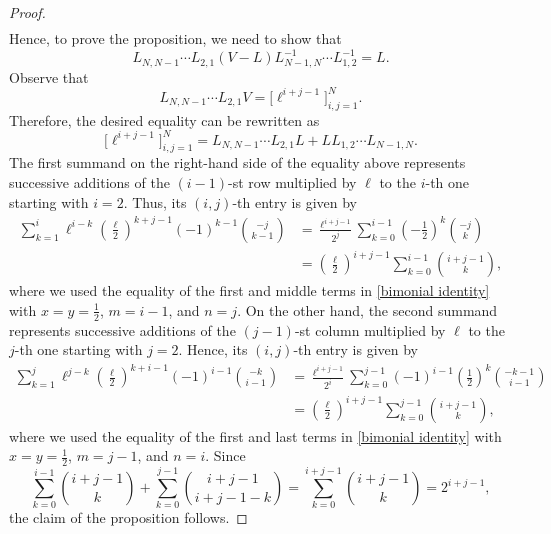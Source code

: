 \documentclass[10pt,a4paper]{amsart}
\begin{document}
\begin{proof}
\begin{multline*}
\end{multline*}
Hence, to prove the proposition, we need to show that
\[
L_{N,N-1}\cdots L_{2,1} (V-L) L_{N-1,N}^{-1} \cdots L_{1,2}^{-1} = L.
\]
Observe that
\[
L_{N,N-1}\cdots L_{2,1} V  = \big[\ell^{i+j-1}\big]_{i,j=1}^N.
\]
Therefore, the desired equality can be rewritten as
\[
\big[\ell^{i+j-1}\big]_{i,j=1}^N = L_{N,N-1}\cdots L_{2,1} L + L L_{1,2}\cdots L_{N-1,N}.
\]
The first summand on the right-hand side of the equality above represents successive additions of the \( (i-1) \)-st row multiplied by \( \ell \) to the \( i\)-th one starting with \( i=2 \). Thus, its \( (i,j) \)-th entry is given by
\begin{align*}
    \sum_{k=1}^i \ell^{i-k}\left(\frac\ell2\right)^{k+j-1}(-1)^{k-1}\binom{-j}{k-1} & = \frac{\ell^{i+j-1}}{2^j} \sum_{k=0}^{i-1} \left(-\frac12 \right)^k \binom{-j}{k} \\
    & = \left(\frac\ell2\right)^{i+j-1}\sum_{k=0}^{i-1} \binom{i+j-1}{k},
\end{align*}
where we used the equality of the first and middle terms in \eqref{bimonial identity} with \( x=y=\tfrac12\), \( m=i-1 \), and \( n=j \). On the other hand, the second summand represents successive additions of the \( (j-1) \)-st column multiplied by \( \ell \) to the \( j\)-th one starting with \( j=2 \). Hence, its \( (i,j) \)-th entry is given by
\begin{align*}
    \sum_{k=1}^j \ell^{j-k}\left(\frac\ell2\right)^{k+i-1}(-1)^{i-1}\binom{-k}{i-1} & = \frac{\ell^{i+j-1}}{2^i} \sum_{k=0}^{j-1} (-1)^{i-1} \left(\frac12\right)^k \binom{-k-1}{i-1} \\
    & = \left(\frac\ell2\right)^{i+j-1} \sum_{k=0}^{j-1}\binom{i+j-1}{k},
\end{align*}
where we used the equality of the first and last terms in \eqref{bimonial identity} with \( x=y=\tfrac12\), \( m=j-1 \), and \( n=i \). Since
\[
\sum_{k=0}^{i-1} \binom{i+j-1}{k} + \sum_{k=0}^{j-1}\binom{i+j-1}{i+j-1-k} = \sum_{k=0}^{i+j-1}\binom{i+j-1}{k} = 2^{i+j-1},
\]
the claim of the proposition follows.
\end{proof}
\end{document}
